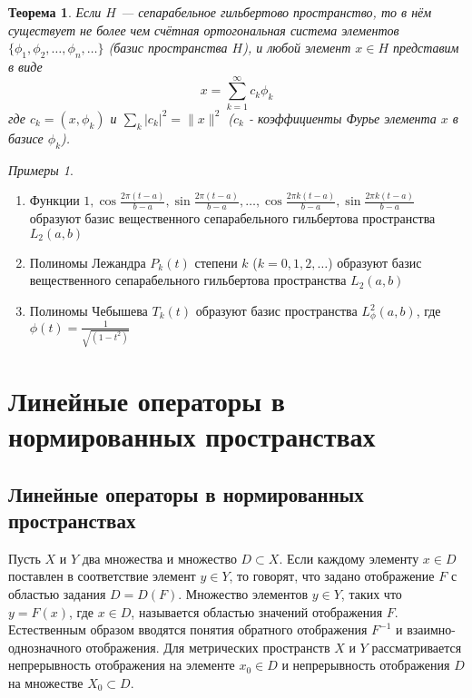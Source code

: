 \documentclass[12pt,a4paper,titlepage,oneside]{book}
\theoremstyle{definition}
\theoremstyle{plain}
\newtheorem*{theorem}{Теорема}
\theoremstyle{remark}
\theoremstyle{remark}
\theoremstyle{remark}
\newtheorem*{examples}{Примеры}
\theoremstyle{remark}
\theoremstyle{plain}
\theoremstyle{plain}
\begin{document}
\begin{theorem}
	Если $H$ --- сепарабельное гильбертово пространство, то в нём существует не более чем счётная ортогональная система элементов $\lbrace \phi_1, \phi_2, \ldots, \phi_n, \ldots \rbrace$ (базис пространства $H$), и любой элемент $x \in H$ представим в виде 
	$$x = \displaystyle\sum_{k=1}^{\infty} c_k \phi_k$$
	где $c_k = (x, \phi_k)$ и $\displaystyle\sum_{k} \lvert c_k \rvert^2 = \parallel x \parallel^2$ ($c_k$ - коэффициенты Фурье элемента $x$ в базисе $\phi_k$).
\end{theorem}

\begin{examples}
\leavevmode
\begin{enumerate}
	\item Функции $1, \cos \frac{2 \pi (t - a)}{b - a}, \sin \frac{2 \pi (t - a)}{b - a}, \ldots, \cos \frac{2 \pi k (t - a)}{b - a}, \sin \frac{2 \pi k (t - a)}{b - a}$ образуют базис вещественного сепарабельного гильбертова пространства $L_2(a, b)$
	
	\item Полиномы Лежандра $P_k(t)$ степени $k$ ($k = 0, 1, 2, \ldots$) образуют базис вещественного сепарабельного гильбертова пространства $L_2(a, b)$
	
	\item Полиномы Чебышева $T_k(t)$ образуют базис пространства $L_{\phi}^2 (a, b)$, где $\phi(t) = \frac{1}{\sqrt{(1 - t^2)}}$
\end{enumerate}
\end{examples}

\chapter{Линейные операторы в нормированных пространствах}

\section{Линейные операторы в нормированных пространствах}
Пусть $X$ и $Y$ два множества и множество $D \subset X$. Если каждому элементу $x \in D$ поставлен в соответствие элемент $y \in Y$, то говорят, что задано отображение $F$ с областью задания $D=D(F)$. Множество элементов $y \in Y$, таких что $y=F(x)$, где $x \in D$, называется областью значений отображения $F$. Естественным образом вводятся понятия обратного отображения ${F}^{-1}$ и взаимно-однозначного отображения. Для метрических пространств $X$ и $Y$ рассматривается непрерывность отображения на элементе $x_0 \in D$ и непрерывность отображения $D$ на множестве $X_0 \subset D$.
\end{document}
